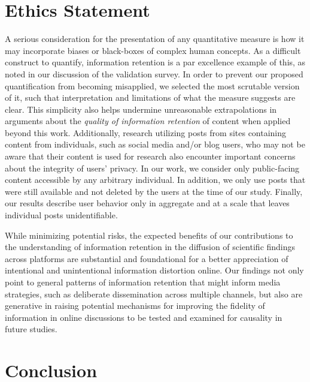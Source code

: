 \documentclass[letterpaper]{article} %
\begin{document}
\section{Ethics Statement}
A serious consideration for the presentation of any quantitative measure is how it may incorporate biases or black-boxes of complex human concepts. As a difficult construct to quantify, information retention is a par excellence example of this, as noted in our discussion of the validation survey. In order to prevent our proposed quantification from becoming misapplied, we selected the most scrutable version of it, such that interpretation and limitations of what the measure suggests are clear. This simplicity also helps undermine unreasonable extrapolations in arguments about the \emph{quality of information retention} of content when applied beyond this work.
Additionally, research utilizing posts from sites containing content from individuals, such as social media and/or blog users, who may not be aware that their content is used for research also encounter important concerns about the integrity of users' privacy. In our work, we consider only public-facing content accessible by any arbitrary individual. In addition, we only use posts that were still available and not deleted by the users at the time of our study. Finally, our results describe user behavior only in aggregate and at a scale that leaves individual posts unidentifiable.

While minimizing potential risks, the expected benefits of our contributions to the understanding of information retention in the diffusion of scientific findings across platforms are substantial and foundational for a better appreciation of intentional and unintentional information distortion online. Our findings not only point to general patterns of information retention that might inform media strategies, such as deliberate dissemination across multiple channels, but also are generative in raising potential mechanisms for improving the fidelity of information in online discussions to be tested and examined for causality in future studies.


\section{Conclusion}
\end{document}
